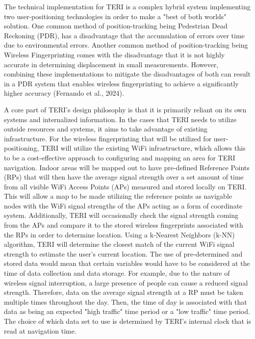 \documentclass{article}
\begin{document}
The technical implementation for TERI is a complex hybrid system implementing two user-positioning technologies in order to make a "best of both worlds" solution. One common method of position-tracking being Pedestrian Dead Reckoning (PDR), has a disadvantage that the accumulation of errors over time due to environmental errors. Another common method of position-tracking being Wireless Fingerprinting comes with the disadvantage that it is not highly accurate in determining displacement in small measurements. However, combining these implementations to mitigate the disadvantages of both can result in a PDR system that enables wireless fingerprinting to achieve a significantly higher accuracy (Fernando et al., 2024).

A core part of TERI's design philosophy is that it is primarily reliant on its own systems and internalized information. In the cases that TERI needs to utilize outside resources and systems, it aims to take advantage of existing infrastructure. For the wireless fingerprinting that will be utilized for user-positioning, TERI will utilize the existing WiFi infrastructure, which allows this to be a cost-effective approach to configuring and mapping an area for TERI navigation. Indoor areas will be mapped out to have pre-defined Reference Points (RPs) that will then have the average signal strength over a set amount of time from all visible WiFi Access Points (APs) measured and stored locally on TERI. This will allow a map to be made utilizing the reference points as navigable nodes with the WiFi signal strengths of the APs acting as a form of coordinate system. Additionally, TERI will occasionally check the signal strength coming from the APs and compare it to the stored wireless fingerprints associated with the RPs in order to determine location. Using a k-Nearest Neighbors (k-NN) algorithm, TERI will determine the closest match of the current WiFi signal strength to estimate the user's current location. The use of pre-determined and stored data would mean that certain variables would have to be considered at the time of data collection and data storage. For example, due to the nature of wireless signal interruption, a large presence of people can cause a reduced signal strength. Therefore, data on the average signal strength at a RP must be taken multiple times throughout the day. Then, the time of day is associated with that data as being an expected "high traffic" time period or a "low traffic" time period. The choice of which data set to use is determined by TERI's internal clock that is read at navigation time.
\end{document}
